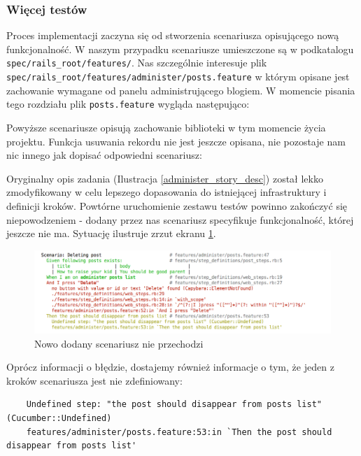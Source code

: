   	\subsubsection{Więcej testów}
  	  Proces implementacji zaczyna się od stworzenia scenariusza opisującego nową funkcjonalność. W naszym przypadku scenariusze umieszczone są w podkatalogu \texttt{spec/rails\_root/features/}. Nas szczególnie interesuje plik \texttt{spec/rails\_root/features/administer/posts.feature} w którym opisane jest zachowanie wymagane od panelu administrującego blogiem. W momencie pisania tego rozdziału plik \texttt{posts.feature} wygląda następująco:
  	  
  	
  	
  	Powyższe scenariusze opisują zachowanie biblioteki w tym momencie życia projektu. Funkcja usuwania rekordu nie jest jeszcze opisana, nie pozostaje nam nic innego jak dopisać odpowiedni scenariusz:
  	
  	
  	
  	Oryginalny opis zadania (Ilustracja \ref{administer_story_desc}) został lekko zmodyfikowany w celu lepszego dopasowania do istniejącej infrastruktury i definicji kroków. Powtórne uruchomienie zestawu testów powinno zakończyć się niepowodzeniem - dodany przez nas scenariusz specyfikuje funkcjonalność, której jeszcze nie ma. Sytuację ilustruje zrzut ekranu \ref{scenario_failure}.
  	
  	\clearpage
  	
  	\begin{figure}[!h]
  		\begin{center}
  			\includegraphics[width=\linewidth]{images/scenario_failure.png}
  			\caption{Nowo dodany scenariusz nie przechodzi}
  			\label{scenario_failure}
  		\end{center}
  	\end{figure}
  	
  	Oprócz informacji o błędzie, dostajemy również informacje o tym, że jeden z kroków scenariusza jest nie zdefiniowany:
  	
  	\begin{lstlisting}
    Undefined step: "the post should disappear from posts list" (Cucumber::Undefined)
    features/administer/posts.feature:53:in `Then the post should disappear from posts list'
    \end{lstlisting}
    
